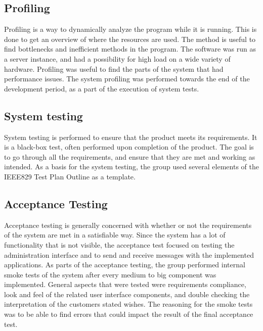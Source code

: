\subsection{Profiling}
\label{subsec:testing-test_description-profiling}

Profiling is a way to dynamically analyze the program while it is running. This is done to get an overview of where the resources are used. The method is useful to find bottlenecks and inefficient methods in the program. The software was run as a server instance, and had a possibility for high load on a wide variety of hardware. Profiling was useful to find the parts of the system that had performance issues. The system profiling was performed towards the end of the development period, as a part of the execution of system tests.

\subsection{System testing}
\label{subsec:testing-test_description-system_testing}

System testing is performed to ensure that the product meets its requirements. It is a black-box test, often performed upon completion of the product. The goal is to go through all the requirements, and ensure that they are met and working as intended. As a basis for the system testing, the group used several elements of the IEEE829 Test Plan Outline \cite{test-plan} as a template.

\subsection{Acceptance Testing}
\label{subsec:testing-test_description-acceptance_testing}
Acceptance testing is generally concerned with whether or not the requirements of the system are met in a satisfiable way. Since the system has a lot of functionality that is not visible, the acceptance test focused on testing the administration interface and to send and receive messages with the implemented applications.
As parts of the acceptance testing, the group performed internal smoke tests \cite{smoke-test} of the system after every medium to big component was implemented. General aspects that were tested were requirements compliance, look and feel of the related user interface components, and double checking the interpretation of the customers stated wishes. The reasoning for the smoke tests was to be able to find errors that could impact the result of the final acceptance test.

